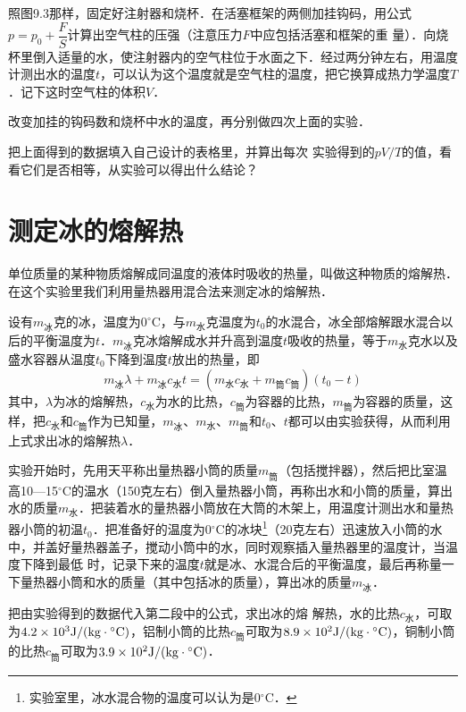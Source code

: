 照图9.3那样，固定好注射器和烧杯．在活塞框架的两侧加挂钩码，用公式$p=p_0+ \dfrac{F}{S}$计算出空气柱的压强（注意压力$F$中应包括活塞和框架的重
量）．向烧杯里倒入适量的水，使注射器内的空气柱位于水面之下．经过两分钟左右，用温度计测出水的温度$t$，可以认为这个温度就是空气柱的温度，把它换算成热力学温度$T$．记下这时空气柱的体积$V$．

改变加挂的钩码数和烧杯中水的温度，再分别做四次上面的实验．

把上面得到的数据填入自己设计的表格里，并算出每次
实验得到的$pV/T$的值，看看它们是否相等，从实验可以得出什么结论？

\section{测定冰的熔解热}

单位质量的某种物质熔解成同温度的液体时吸收的热量，叫做这种物质的熔解热．在这个实验里我们利用量热器用混合法来测定冰的熔解热．

设有$m_{\text{冰}}$克的冰，温度为0$^\circ$C，与$m_{\text{水}}$克温度为$t_0$的水混合，冰全部熔解跟水混合以后的平衡温度为$t$．$m_{\text{冰}}$克冰熔解成水并升高到温度$t$吸收的热量，等于$m_{\text{水}}$克水以及盛水容器从温度$t_0$下降到温度$t$放出的热量，即
\[m_{\text{冰}}\lambda+m_{\text{冰}}c_{\text{水}}t=(m_{\text{水}}c_{\text{水}}+m_{\text{筒}}c_{\text{筒}})(t_0-t)  \]
其中，$\lambda$为冰的熔解热，$c_{\text{水}}$为水的比热，$c_{\text{筒}}$为容器的比热，$m_{\text{筒}}$为容器的质量，这样，把$c_{\text{水}}$和$c_{\text{筒}}$作为已知量，$m_{\text{冰}}$、$m_{\text{水}}$、$m_{\text{筒}}$和$t_0$、$t$都可以由实验获得，从而利用上式求出冰的熔解热$\lambda$．

实验开始时，先用天平称出量热器小筒的质量$m_{\text{筒}}$（包括搅拌器），然后把比室温高10—15$^\circ$C的温水（150克左右）倒入量热器小筒，再称出水和小筒的质量，算出水的质量$m_{\text{水}}$．把装着水的量热器小筒放在大筒的木架上，用温度计测出水和量热器小筒的初温$t_0$．把准备好的温度为0$^\circ$C的冰块\footnote{实验室里，冰水混合物的温度可以认为是0$^\circ$C．}（20克左右）迅速放入小筒的水中，并盖好量热器盖子，搅动小筒中的水，同时观察插入量热器里的温度计，当温度下降到最低
时，记录下来的温度$t$就是冰、水混合后的平衡温度，最后再称量一下量热器小筒和水的质量（其中包括冰的质量），算出冰的质量$m_{\text{冰}}$．

把由实验得到的数据代入第二段中的公式，求出冰的熔
解热，水的比热$c_{\text{水}}$，可取为$4.2\times10^3{\rm J}/({\rm kg}\cdot {}^\circ{\rm C})$，铝制小筒的比热$c_{\text{筒}}$可取为$8.9\times10^2 {\rm J}/({\rm kg}\cdot {}^\circ{\rm C})$，铜制小筒的比热$c_{\text{筒}}$可取为$3.9\times10^2{\rm J}/({\rm kg}\cdot {}^\circ{\rm C})$．

